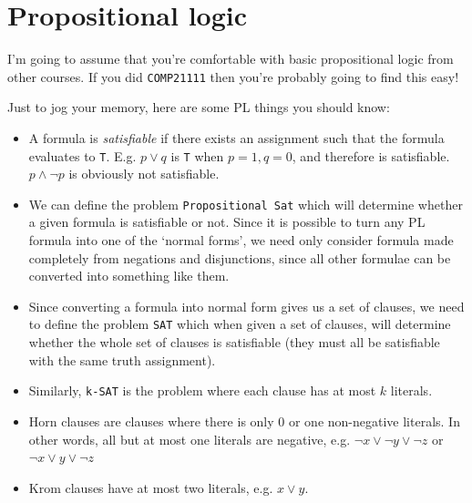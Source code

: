 \section{Propositional logic}

I'm going to assume that you're comfortable with basic propositional logic from
other courses. If you did \texttt{COMP21111} then you're probably going to find
this easy!

Just to jog your memory, here are some PL things you should know:

\begin{itemize}
  \item A formula is \textit{satisfiable} if there exists an assignment such 
  that the formula evaluates to \texttt{T}. E.g. $p \vee q$ is \texttt{T} when $
  p = 1, q = 0$, and therefore is satisfiable. $p \wedge \neg p$ is obviously 
  not satisfiable.

  \item We can define the problem \texttt{Propositional Sat} which will 
  determine whether a given formula is satisfiable or not. Since it is possible 
  to turn any PL formula into one of the `normal forms', we need only consider 
  formula made completely from negations and disjunctions, since all other 
  formulae can be converted into something like them.

  \item Since converting a formula into normal form gives us a set of clauses, 
  we need to define the problem \texttt{SAT} which when given a set of clauses, 
  will determine whether the whole set of clauses is satisfiable (they must all 
  be satisfiable with the same truth assignment).

  \item Similarly, \texttt{k-SAT} is the problem where each clause has at most
  $k$ literals.


  \item Horn clauses are clauses where there is only 0 or one non-negative 
  literals. In other words, all but at most one literals are negative, e.g.
  $\neg x \vee \neg y \vee \neg z$ or $\neg x \vee y \vee \neg z$

  \item Krom clauses have at most two literals, e.g. $x \vee y$.
\end{itemize}


